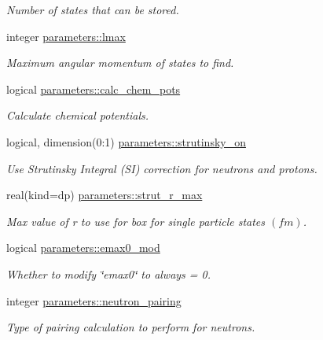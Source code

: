 \begin{DoxyCompactItemize}
\begin{DoxyCompactList}\small\item\em Number of states that can be stored. \end{DoxyCompactList}\item 
integer \mbox{\hyperlink{group__INPUT__PARS_gaee5c7e64e0f524d969ac1848094fdbac}{parameters\+::lmax}}
\begin{DoxyCompactList}\small\item\em Maximum angular momentum of states to find. \end{DoxyCompactList}\item 
logical \mbox{\hyperlink{group__INPUT__PARS_ga6e579a9756d3f1c4d2ddc58a161b1f1a}{parameters\+::calc\+\_\+chem\+\_\+pots}}
\begin{DoxyCompactList}\small\item\em Calculate chemical potentials. \end{DoxyCompactList}\item 
logical, dimension(0\+:1) \mbox{\hyperlink{group__INPUT__PARS_gaad3b88a661482173813a2f76cba73b11}{parameters\+::strutinsky\+\_\+on}}
\begin{DoxyCompactList}\small\item\em Use Strutinsky Integral (SI) correction for neutrons and protons. \end{DoxyCompactList}\item 
real(kind=dp) \mbox{\hyperlink{group__INPUT__PARS_ga0dd8e62aa4b777681ce98d7c88cafdf8}{parameters\+::strut\+\_\+r\+\_\+max}}
\begin{DoxyCompactList}\small\item\em Max value of r to use for box for single particle states $(fm)$. \end{DoxyCompactList}\item 
logical \mbox{\hyperlink{group__INPUT__PARS_gacfc9efb68b340c8246340105af8678e0}{parameters\+::emax0\+\_\+mod}}
\begin{DoxyCompactList}\small\item\em Whether to modify \char`\"{}emax0\char`\"{} to always = 0. \end{DoxyCompactList}\item 
integer \mbox{\hyperlink{group__INPUT__PARS_gad6072a097df429aca7d4c3daf808ceda}{parameters\+::neutron\+\_\+pairing}}
\begin{DoxyCompactList}\small\item\em Type of pairing calculation to perform for neutrons. \end{DoxyCompactList}\item 

\end{DoxyCompactItemize}

